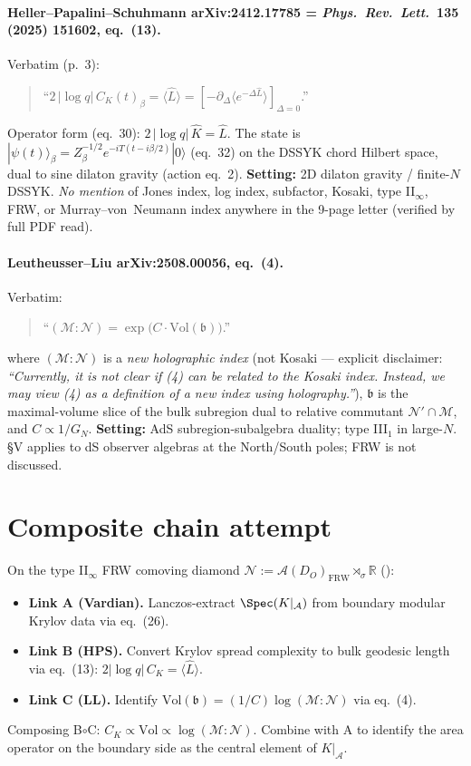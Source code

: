 \documentclass[11pt]{article}
\newcommand{\R}{\mathbb{R}}
\newcommand{\AA}{\mathcal{A}}
\newcommand{\NN}{\mathcal{N}}
\newcommand{\MM}{\mathcal{M}}
\newcommand{\FRW}{\mathrm{FRW}}
\begin{document}
\paragraph{Heller--Papalini--Schuhmann arXiv:2412.17785 = \emph{Phys.~Rev.\ Lett.}\ \textbf{135} (2025) 151602, eq.~(13).}
Verbatim (p.~3):
\begin{quote}
``$2\,|\log q|\, C_K(t)_\beta = \langle \hat{L}\rangle = [-\partial_\Delta\langle e^{-\Delta\hat L}\rangle]_{\Delta=0}$.''
\end{quote}
Operator form (eq.~30): $2\,|\log q|\, \hat K = \hat L$. The state is
$|\psi(t)\rangle_\beta = Z_\beta^{-1/2} e^{-iT(t-i\beta/2)} |0\rangle$ (eq.~32) on the DSSYK
chord Hilbert space, dual to sine dilaton gravity (action eq.~2).
\textbf{Setting:} 2D dilaton gravity / finite-$N$ DSSYK. \emph{No mention} of Jones
index, log index, subfactor, Kosaki, type II$_\infty$, FRW, or Murray--von~Neumann
index anywhere in the 9-page letter (verified by full PDF read).

\paragraph{Leutheusser--Liu arXiv:2508.00056, eq.~(4).}
Verbatim:
\begin{quote}
``$(\MM:\NN) = \exp\!\big(C\cdot\mathrm{Vol}(\mathfrak{b})\big)$.''
\end{quote}
where $(\MM:\NN)$ is a \emph{new holographic index} (not Kosaki --- explicit disclaimer:
\emph{``Currently, it is not clear if (4) can be related to the Kosaki index.
Instead, we may view (4) as a definition of a new index using holography.''}),
$\mathfrak{b}$ is the maximal-volume slice of the bulk subregion dual to relative
commutant $\NN'\cap\MM$, and $C\propto 1/G_N$. \textbf{Setting:} AdS subregion-subalgebra
duality; type III$_1$ in large-$N$. \S{}V applies to dS observer algebras at the
North/South poles; FRW is not discussed.

\section{Composite chain attempt}\label{sec:chain}

On the type II$_\infty$ FRW comoving diamond
$\NN := \AA(D_O)_\FRW \rtimes_\sigma \R$ (\cite[Thm.~3.5]{Remondiere2026}):
\begin{itemize}
\item \textbf{Link A (Vardian).} Lanczos-extract $\Spec(K|_\AA)$ from boundary modular
Krylov data via eq.~(26).
\item \textbf{Link B (HPS).} Convert Krylov spread complexity to bulk geodesic length
via eq.~(13): $2|\log q|\, C_K = \langle\hat L\rangle$.
\item \textbf{Link C (LL).} Identify $\mathrm{Vol}(\mathfrak{b}) = (1/C)\log(\MM:\NN)$
via eq.~(4).
\end{itemize}
Composing B$\circ$C: $C_K \propto \mathrm{Vol} \propto \log(\MM:\NN)$. Combine with A
to identify the area operator on the boundary side as the central element of $K|_\AA$.
\end{document}
